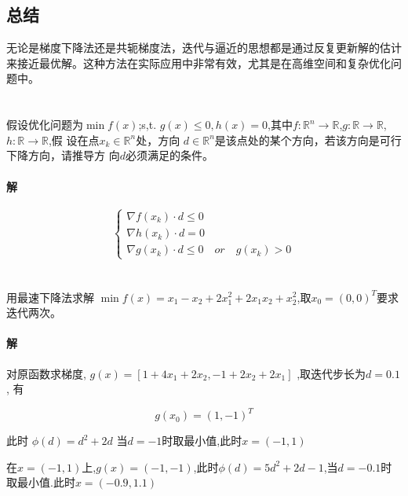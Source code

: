 \documentclass[a4paper]{article}
\begin{document}
\subsection{总结}

无论是梯度下降法还是共轭梯度法，迭代与逼近的思想都是通过反复更新解的估计来接近最优解。这种方法在实际应用中非常有效，尤其是在高维空间和复杂优化问题中。
\section{}
假设优化问题为\(\min f(x)\);s,t. $g(x) \leq 0,h(x) = 0$,其中$f: \mathbb{R}^n \rightarrow \mathbb{R}$,$g : \mathbb{R} \rightarrow \mathbb{R}$, $h : \mathbb{R} \rightarrow \mathbb{R}$,假
设在点$x_k \in \mathbb{R} ^n$处，方向 $d \in \mathbb{R}^n$是该点处的某个方向，若该方向是可行下降方向，请推导方
向$d$必须满足的条件。 

\paragraph{解}

\[\left\{\begin{array}{c}
    \nabla f(x_k) \cdot d \leq 0 \\
    \nabla h(x_k) \cdot d  = 0\\
    \nabla g(x_k) \cdot d \leq 0 \quad or \quad g(x_k) > 0 
\end{array}\right.\]

\section{}

用最速下降法求解 \(\min f(x) = x_1 - x_2 + 2x_1^2 +2x_1x_2 +x_2^2\),取\(x_0 = (0,0)^T\)要求迭代两次。

\paragraph{解}

对原函数求梯度, \(g(x) = [1+4x_1 + 2x_2, -1 +2x_2 + 2x_1]\) ,取迭代步长为$d=0.1$, 有

\[g(x_0) =(1,-1)^T \]

此时 \(\phi(d) =d^{2} + 2 d\) 当\(d = -1\)时取最小值,此时$x = (-1,1)$

在$x= (-1,1)$上,$g(x) = (-1,-1)$,此时\(\phi(d) = 5 d^{2} + 2 d - 1\),当$d=-0.1$时取最小值.此时$x=(-0.9,1.1)$


\section{}
\end{document}
